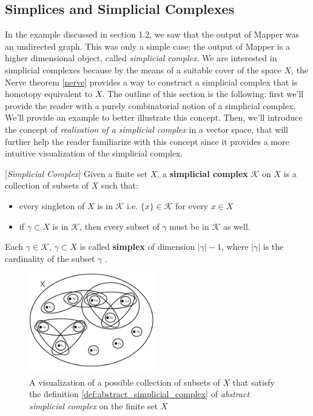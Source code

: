 \subsection{Simplices and Simplicial Complexes}
In the example discussed in section 1.2, we saw that the output of Mapper was an undirected graph. This was only a simple case; the output of Mapper is a higher dimensional object, called \textit{simplicial complex}. We are interested in simplicial complexes because by the means of a suitable cover of the space $X$, the Nerve theorem \ref{nerve} provides a way to construct a simplicial complex that is homotopy equivalent to $X$. The outline of this section is the following: first we'll provide the reader with a purely combinatorial notion of a simplicial complex.  We'll provide an example to better illustrate this concept. Then, we'll introduce the concept of \textit{realization of a simplicial complex} in a vector space, that will further help the reader familiarize with this concept since it provides a more intuitive visualization of the simplicial complex. 

\begin{definition}{[\textit{Simplicial Complex}]}
	Given a finite set $X$, a \textbf{ simplicial complex} $\mathcal{K}$ on $X$ is a collection of subsets of $X$ such that:
	\begin{itemize}
		\item every singleton of $X$ is in $\mathcal{K}$ i.e. $\{x\} \in \mathcal{K}$ for every $x \in X$
		\item if $\gamma \subset X$ is in $\mathcal{K}$, then every subset of $\gamma$ must be in $\mathcal{K}$ as well.
	\end{itemize}
	Each $\gamma \in \mathcal{K}$, $\gamma \subset X$   is called \textbf{simplex} of dimension $|\gamma|-1$, where $|\gamma|$ is the cardinality of the subset $\gamma$ .
	\label{def:abstract_simplicial_complex}
\end{definition}

\begin{figure}[htbp!] 
	\centering    
	\includegraphics[width=0.5\textwidth]{abstract_simplicial_complex.png}
	\caption{A visualization of a possible collection of subsets of $X$ that satisfy the definition \ref{def:abstract_simplicial_complex} of \textit{abstract simplicial complex} on the finite set $X$ }
	\label{fig:abstract_simplicial_complex}
\end{figure}

